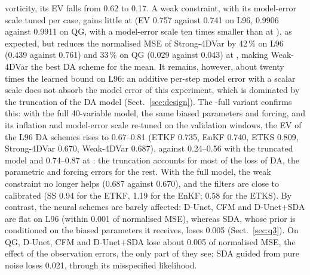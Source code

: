 vorticity, its EV falls from 0.62 to 0.17. A weak constraint, with its model-error scale tuned per case, gains
little at \Sz{} (EV 0.757 against 0.741 on L96, 0.9906 against 0.9911 on QG, with a model-error scale ten times smaller than at \So), as expected, but reduces the normalised
MSE of Strong-4DVar by 42\,\% on L96 (0.439 against 0.761) and 33\,\% on QG (0.029
against 0.043) at \So{}, making Weak-4DVar the best DA scheme for the mean. It remains,
however, about twenty times the learned bound on L96: an additive per-step model error with
a scalar scale does not absorb the model error of this experiment, which is dominated by the
truncation of the DA model (Sect.~\ref{sec:design}). The \So-full variant confirms this: with the
full 40-variable model, the same biased parameters and forcing, and its inflation and model-error scale
re-tuned on the validation windows, the EV of the L96 DA schemes rises to 0.67--0.81 (ETKF 0.735, EnKF
0.740, ETKS 0.809, Strong-4DVar 0.670, Weak-4DVar 0.687), against 0.24--0.56 with the truncated model
and 0.74--0.87 at \Sz{}: the truncation accounts for most of the \So{} loss of DA, the parametric and
forcing errors for the rest. With the full model, the weak constraint no longer helps (0.687 against
0.670), and the filters are close to calibrated (SS 0.94 for the ETKF, 1.19 for the EnKF; 0.58 for the
ETKS). By contrast, the neural schemes are
barely affected: D-Unet, CFM and D-Unet+SDA are flat on L96 (within 0.001 of normalised
MSE), whereas SDA, whose prior is conditioned on the biased parameters it receives, loses 0.005
(Sect.~\ref{sec:q3}). On QG, D-Unet, CFM and D-Unet+SDA lose about 0.005 of normalised MSE, the effect of the
\So{} observation errors, the only part of \So{} they see; SDA guided from pure noise loses
0.021, through its misspecified likelihood.

